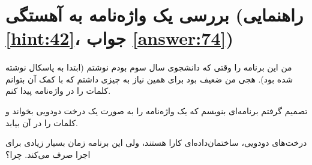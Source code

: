 \section[بررسی یک واژه‌نامه به آهستگی]{بررسی یک واژه‌نامه به آهستگی \protect{} (راهنمایی \ref{hint:42}، جواب \ref{answer:74})}
\paragraph{}\label{prog:61}
من این برنامه را وقتی که دانشجوی سال سوم  بودم نوشتم (ابتدا به پاسکال نوشته شده بود). هجی من ضعیف بود برای همین نیاز به چیزی داشتم که با کمک آن بتوانم کلمات را در واژه‌نامه پیدا کنم.

تصمیم گرفتم برنامه‌ای بنویسم که یک واژه‌نامه را به صورت یک درخت دودویی بخواند و کلمات را در آن بیابد.

درخت‌های دودویی، ساختمان‌داده‌ای کارا هستند، ولی این برنامه زمان بسیار زیادی برای اجرا صرف می‌کند. چرا؟


